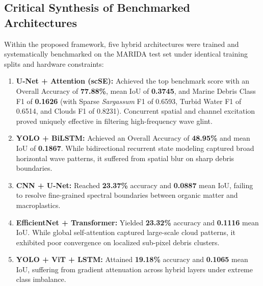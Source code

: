 \documentclass[conference]{IEEEtran}
\begin{document}
\subsection{Critical Synthesis of Benchmarked Architectures}
Within the proposed framework, five hybrid architectures were trained and systematically benchmarked on the MARIDA test set under identical training splits and hardware constraints:
\begin{enumerate}
    \item \textbf{U-Net + Attention (scSE):} Achieved the top benchmark score with an Overall Accuracy of \textbf{77.88\%}, mean IoU of \textbf{0.3745}, and Marine Debris Class F1 of \textbf{0.1626} (with Sparse \textit{Sargassum} F1 of 0.6593, Turbid Water F1 of 0.6514, and Clouds F1 of 0.8231). Concurrent spatial and channel excitation proved uniquely effective in filtering high-frequency wave glint.
    \item \textbf{YOLO + BiLSTM:} Achieved an Overall Accuracy of \textbf{48.95\%} and mean IoU of \textbf{0.1867}. While bidirectional recurrent state modeling captured broad horizontal wave patterns, it suffered from spatial blur on sharp debris boundaries.
    \item \textbf{CNN + U-Net:} Reached \textbf{23.37\%} accuracy and \textbf{0.0887} mean IoU, failing to resolve fine-grained spectral boundaries between organic matter and macroplastics.
    \item \textbf{EfficientNet + Transformer:} Yielded \textbf{23.32\%} accuracy and \textbf{0.1116} mean IoU. While global self-attention captured large-scale cloud patterns, it exhibited poor convergence on localized sub-pixel debris clusters.
    \item \textbf{YOLO + ViT + LSTM:} Attained \textbf{19.18\%} accuracy and \textbf{0.1065} mean IoU, suffering from gradient attenuation across hybrid layers under extreme class imbalance.
\end{enumerate}

\balance
\end{document}
